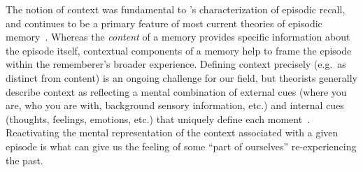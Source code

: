 \documentclass{article}
\begin{document}
The notion of context was fundamental to \citeauthor{Tulv83}'s characterization of episodic recall, and continues to be a primary feature of most current theories of episodic memory~\citep[e.g.\ for review see][]{Kaha12}.  Whereas the \textit{content} of a memory provides specific information about the episode itself, contextual components of a memory help to frame the episode within the rememberer's broader experience.  Defining context precisely (e.g.\ as distinct from content) is an ongoing challenge for our field, but theorists generally describe context as reflecting a mental combination of external cues (where you are, who you are with, background sensory information, etc.) and internal cues (thoughts, feelings, emotions, etc.) that uniquely define each moment~\citep[e.g.\ see review by][]{MannEtal15}.  Reactivating the mental representation of the context associated with a given episode is what can give us the feeling of some ``part of ourselves'' re-experiencing the past.
\end{document}
